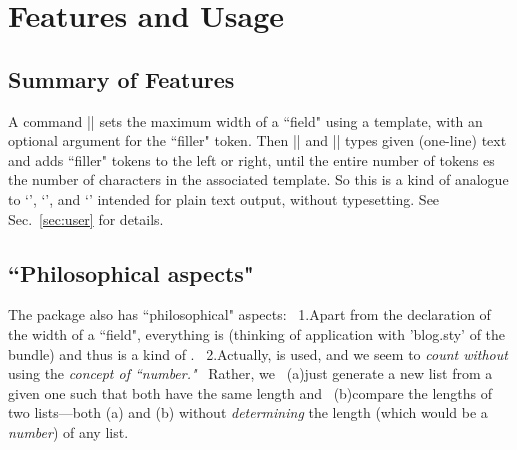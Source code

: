 \documentclass[fleqn]{article}%
\begin{document}
\maketitle
\begin{abstract}\noindent
'monofill.sty' addresses horizontal alignment with plain text 
as in the result of \LaTeX's `\listfiles'. 
In the first instance, it has been developed as the shared 
tool to adjust each column with the  package.
It may also be useful for alignment in typesetting monospaced 
characters as in figure tables, for simulating a typewriter, 
or for code listings. 
v0.2 in fact provides a tool for use with the               %
 package that in turn has been made for console output. 
The implementation also has ``philosophical aspects" 
in avoiding use of a counter register.
\end{abstract}
\tableofcontents

\section{Features and Usage}
\subsection{Summary of Features}
A command |\MFfieldtemplate| sets the maximum width of a ``field" 
using a template, 
with an optional argument for the ``filler" token.
Then |\MFleftinfield| and |\MFrightinfield| types given 
(one-line) text and adds ``filler" tokens to the left or right, 
until the entire number of tokens es the number of characters 
in the associated template. So this is a kind of analogue to 
`\settowidth{\mylength}{<template>}', 
`', and
`'
intended for plain text output, without typesetting.
See Sec.~\ref{sec:user} for details.

\subsection{``Philosophical aspects"}
The package also has ``philosophical" aspects: \ 
1.\enspace Apart from the declaration of the width of a ``field", 
everything is \strong{expandable} (thinking of application with 'blog.sty' 
of the \ctanpkgref{morehype} bundle) and thus is a kind of 
. \ 
2.\enspace Actually,  is used, 
and we seem to \emph{count without} using the \emph{concept of ``number."}
\
Rather, we \ (a)\enspace just generate a new list from a given one such 
that both have the same length and \ 
(b)\enspace compare the lengths of two lists---both (a) and (b) 
without \emph{determining} the length (which would be a \emph{number}) 
of any list. 
\end{document}
